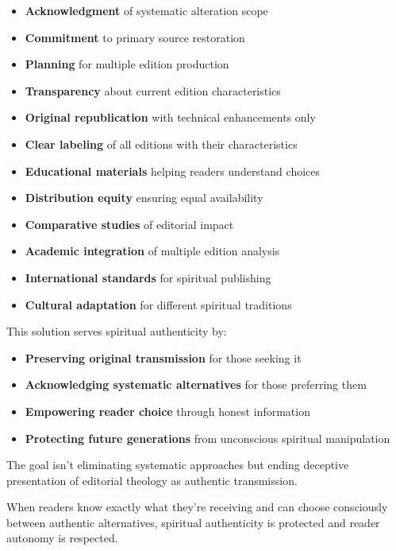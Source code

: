 \documentclass[12pt,twoside]{book}
\begin{document}
\begin{itemize}
\item \textbf{\textbf{Acknowledgment}} of systematic alteration scope
\item \textbf{\textbf{Commitment}} to primary source restoration
\item \textbf{\textbf{Planning}} for multiple edition production
\item \textbf{\textbf{Transparency}} about current edition characteristics

\item \textbf{\textbf{Original republication}} with technical enhancements only
\item \textbf{\textbf{Clear labeling}} of all editions with their characteristics
\item \textbf{\textbf{Educational materials}} helping readers understand choices
\item \textbf{\textbf{Distribution equity}} ensuring equal availability

\item \textbf{\textbf{Comparative studies}} of editorial impact
\item \textbf{\textbf{Academic integration}} of multiple edition analysis
\item \textbf{\textbf{International standards}} for spiritual publishing
\item \textbf{\textbf{Cultural adaptation}} for different spiritual traditions
\end{itemize}

This solution serves spiritual authenticity by:
\begin{itemize}
\item \textbf{\textbf{Preserving original transmission}} for those seeking it
\item \textbf{\textbf{Acknowledging systematic alternatives}} for those preferring them
\item \textbf{\textbf{Empowering reader choice}} through honest information
\item \textbf{\textbf{Protecting future generations}} from unconscious spiritual manipulation
\end{itemize}

The goal isn't eliminating systematic approaches but ending deceptive presentation of editorial theology as authentic transmission.

When readers know exactly what they're receiving and can choose consciously between authentic alternatives, spiritual authenticity is protected and reader autonomy is respected.
\end{document}
